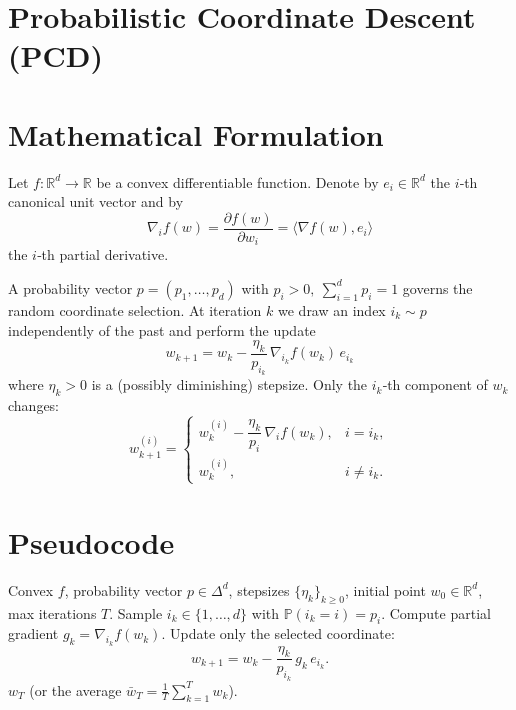 \documentclass[11pt]{article}
\begin{document}
\section*{Probabilistic Coordinate Descent (PCD)}

\section*{Mathematical Formulation}
Let $f:\mathbb{R}^{d}\rightarrow\mathbb{R}$ be a convex differentiable function.  
Denote by $e_i\in\mathbb{R}^{d}$ the $i$‑th canonical unit vector and by
\[
\nabla_i f(w)=\frac{\partial f(w)}{\partial w_i}= \langle\nabla f(w),e_i\rangle
\]
the $i$‑th partial derivative.  

A probability vector $p=(p_1,\dots ,p_d)$ with $p_i>0,\ \sum_{i=1}^{d}p_i=1$
governs the random coordinate selection.  
At iteration $k$ we draw an index $i_k\sim p$ independently of the past and perform the update
\begin{equation}
\boxed{\;
w_{k+1}=w_k-\frac{\eta_k}{p_{i_k}}\,\nabla_{i_k}f(w_k)\,e_{i_k}
\;}
\label{eq:update}
\end{equation}
where $\eta_k>0$ is a (possibly diminishing) stepsize.  
Only the $i_k$‑th component of $w_k$ changes:
\[
w_{k+1}^{(i)}=
\begin{cases}
w_{k}^{(i)}-\dfrac{\eta_k}{p_i}\,\nabla_i f(w_k), & i=i_k,\\[6pt]
w_{k}^{(i)}, & i\neq i_k .
\end{cases}
\]

\section*{Pseudocode}
\begin{algorithm}[H]
\caption{Probabilistic Coordinate Descent}
\begin{algorithmic}[1]
\Require Convex $f$, probability vector $p\in\Delta^{d}$, stepsizes $\{\eta_k\}_{k\ge0}$, initial point $w_0\in\mathbb{R}^{d}$, max iterations $T$.
    \State Sample $i_k\in\{1,\dots ,d\}$ with $\mathbb{P}(i_k=i)=p_i$.
    \State Compute partial gradient $g_{k}= \nabla_{i_k}f(w_k)$.
    \State Update only the selected coordinate:
    \[
    w_{k+1}=w_k-\frac{\eta_k}{p_{i_k}}\,g_{k}\,e_{i_k}.
    \]
\EndFor
\State \Return $w_T$ (or the average $\bar w_T=\tfrac1T\sum_{k=1}^{T}w_k$).
\end{algorithmic}
\end{algorithm}
\end{document}
